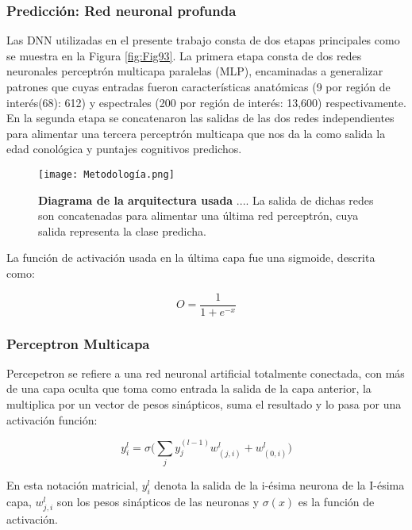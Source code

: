 \documentclass[11pt,letterpaper]{article}
\numberwithin{equation}{subsection}
\numberwithin{table}{subsection}
\begin{document}
\subsubsection{Predicción: Red neuronal profunda}

\noindent Las DNN utilizadas en el presente trabajo consta de dos etapas principales como se muestra en la Figura \ref{fig:Fig93}. La primera etapa consta de dos redes neuronales perceptrón multicapa paralelas (MLP), encaminadas a generalizar patrones que cuyas entradas fueron características anatómicas (9 por región de interés(68): 612) y espectrales (200 por región de interés: 13,600)  respectivamente. En la segunda etapa se concatenaron las salidas de las dos redes independientes para alimentar una tercera perceptrón multicapa que nos da la como salida la edad conológica y puntajes cognitivos predichos. 

\bigskip
\begin{figure}[H]
\centering
	\texttt{[image: Metodología.png]}
	\captionsetup{labelfont=bf}
	\caption{\scriptsize \textbf {Diagrama de la arquitectura usada} .... La salida de dichas redes son concatenadas para alimentar una última red perceptrón, cuya salida representa la clase predicha.}
	\label{fig:Fig16}
\end{figure} 

\bigskip
\noindent La función de activación usada en la última capa fue una sigmoide, descrita como:

\begin{equation}
O=\frac{1}{1+e^{-x}}
\end{equation}

\subsubsection{Perceptron Multicapa}

\noindent Percepetron \cite{minsky1969perceptron} se refiere a una red neuronal artificial totalmente conectada, con más de una capa oculta que toma como entrada la salida de la capa anterior, la multiplica por un vector de pesos sinápticos, suma el resultado y lo pasa por una activación función:

\begin{equation}
y_i^l=\sigma \Big(\sum_jy_j^{(l-1)}w_{(j,i)}^l + w_{(0,i)}^l \Big)
\end{equation}

\bigskip
En esta notación matricial, $ y_i ^ l $ denota la salida de la i-ésima neurona de la I-ésima capa, $ w_ {j, i} ^ l $ son los pesos sinápticos de las neuronas y $\sigma(x) $ es la función de activación.
\end{document}
